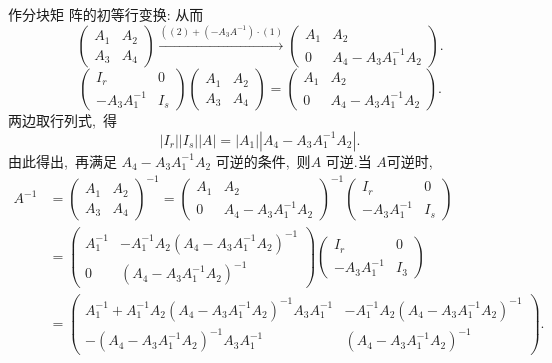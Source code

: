 \begin{solution}
	作分块矩 阵的初等行变换:
	从而
	$$\left(\begin{array}{ll}
		A_{1} & A_{2} \\
		A_{3} & A_{4}
	\end{array}\right) \stackrel{\left((2)+\left(-A_{3} A^{-1}\right) \cdot (1)\right.}{\longrightarrow}\left(\begin{array}{cc}
		A_{1} & A_{2} \\
		0 & A_{4}-A_{3} A_{1}^{-1} A_{2}
	\end{array}\right) .$$
	$$\left(\begin{array}{cc}
		I_{r} & 0 \\
		-A_{3} A_{1}^{-1} & I_{s}
	\end{array}\right)\left(\begin{array}{ll}
		A_{1} & A_{2} \\
		A_{3} & A_{4}
	\end{array}\right)=\left(\begin{array}{cc}
		A_{1} & A_{2} \\
		0 & A_{4}-A_{3} A_{1}^{-1} A_{2}
	\end{array}\right) .$$
	两边取行列式,\ 得
	$$\left|I_{r}\right|\left|I_{s}\right||A|=\left|A_{1}\right|\left|A_{4}-A_{3} A_{1}^{-1} A_{2}\right| .$$
	由此得出,\  再满足 $ A_{4}-A_{3} A_{1}^{-1} A_{2} $ 可逆的条件,\  则$  A $ 可逆.当 $ A  $可逆时,\ 
	$$\begin{aligned}
		A^{-1} & =\left(\begin{array}{ll}
			A_{1} & A_{2} \\
			A_{3} & A_{4}
		\end{array}\right)^{-1}=\left(\begin{array}{cc}
			A_{1} & A_{2} \\
			0 & A_{4}-A_{3} A_{1}^{-1} A_{2}
		\end{array}\right)^{-1} \left(\begin{array}{cc}
			I_{r} & 0 \\
			-A_{3} A_{1}^{-1} & I_{s}
		\end{array}\right) \\
		& =\left(\begin{array}{cc}
			A_{1}^{-1} & -A_{1}^{-1} A_{2}\left(A_{4}-A_{3} A_{1}^{-1} A_{2}\right)^{-1} \\
			0 & \left(A_{4}-A_{3} A_{1}^{-1} A_{2}\right)^{-1}
		\end{array}\right)\left(\begin{array}{cc}
			I_{r} & 0 \\
			-A_{3} A_{1}^{-1} & I_{3}
		\end{array}\right) \\
		& =\left(\begin{array}{cc}
			A_{1}^{-1}+A_{1}^{-1} A_{2}\left(A_{4}-A_{3} A_{1}^{-1} A_{2}\right)^{-1} A_{3} A_{1}^{-1} & -A_{1}^{-1} A_{2}\left(A_{4}-A_{3} A_{1}^{-1} A_{2}\right)^{-1} \\
			-\left(A_{4}-A_{3} A_{1}^{-1} A_{2}\right)^{-1} A_{3} A_{1}^{-1} & \left(A_{4}-A_{3} A_{1}^{-1} A_{2}\right)^{-1}
		\end{array}\right) .
	\end{aligned}$$
\end{solution}
